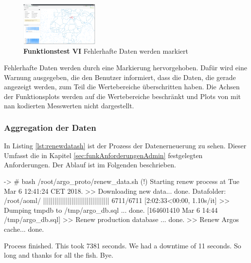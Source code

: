 \begin{figure}
 \centering
 \includegraphics[width=0.35\textwidth]{pix/ftest/00fail.png}

 \caption{\textbf{Funktionstest VI} Fehlerhafte Daten werden markiert}
 \label{fig:ftest00fail}
\end{figure}

Fehlerhafte Daten werden durch eine Markierung hervorgehoben. Dafür wird eine Warnung ausgegeben, die den Benutzer informiert, dass die Daten, die gerade angezeigt werden, zum Teil die Wertebereiche überschritten haben. Die Achsen der Funktionsplots werden auf die Wertebereiche beschränkt und Plots von mit nan kodierten Messwerten nicht dargestellt.
\newline
\newline



\subsubsection{Aggregation der Daten}

In Listing \ref{lst:renewdatash} ist der Prozess der Datenerneuerung zu sehen. Dieser Umfasst die in Kapitel \ref{sec:funkAnforderungenAdmin} festgelegten Anforderungen. Der Ablauf ist im Folgenden beschrieben.

\begin{python}[%
        label={lst:renewdatash},%
        caption={Erneuerung des Datensatzes}]
 -> # bash /root/argo_proto/renew_data.sh
(!) Starting renew process at Tue Mar  6 12:41:24 CET 2018.
 >> Downloading new data...
        done.
Datafolder: /root/aoml/
||||||||||||||||||||||||||||||||||| 6711/6711 [2:02:33<00:00,  1.10s/it]
 >> Dumping tmpdb to /tmp/argo_db.sql ...
        done. [164601410 Mar  6 14:44 /tmp/argo_db.sql]
 >> Renew production database ...
        done.
 >> Renew Argos cache...  
        done.

Process finished.
This took  7381 seconds.
We had a downtime of 11 seconds.
So long and thanks for all the fish. Bye.
\end{python}

